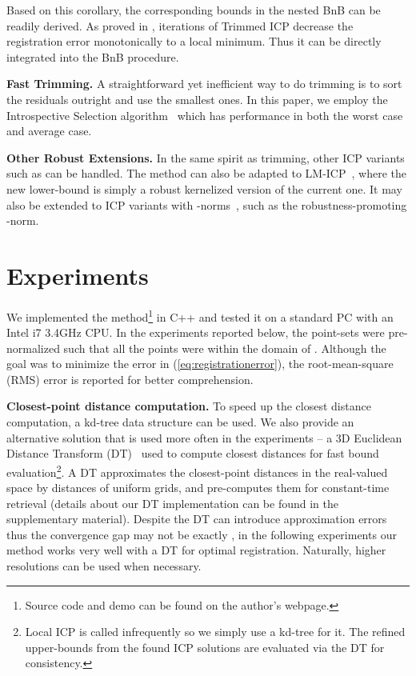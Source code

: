 \documentclass[10pt,journal,cspaper,compsoc]{IEEEtran}
\begin{document}
Based on this corollary, the corresponding bounds in the nested BnB can be readily derived. As proved in \cite{chetverikov2005robust}, iterations of Trimmed ICP decrease the registration error monotonically to a local minimum. Thus it can be directly integrated into the BnB procedure.

\vspace{0.06in}
\noindent\textbf{Fast Trimming.}
A straightforward yet inefficient way to do trimming is to sort the residuals outright and use the  smallest ones. In this paper, we employ \textcolor[rgb]{0.00,0.00,0.00}{the Introspective Selection algorithm}~\cite{musser1997introspective} which has  performance in both the worst case and average case.

\vspace{0.06in}
\noindent\textbf{Other Robust Extensions.}
In the same spirit as trimming, other ICP variants such as \cite{champleboux1992accurate,masuda1994robust} can be handled. The method can also be adapted to LM-ICP~\cite{fitzgibbon2003robust}, where the new lower-bound is simply a robust kernelized version of the current one. It may also be extended to ICP variants with -norms~\cite{bouaziz2013sparse}, such as the robustness-promoting -norm.

\section{Experiments}\label{sec:experiment}
We implemented the method\footnote{Source code and demo can be found on the author's webpage.} in C++ and tested it on a standard PC with an Intel i7 3.4GHz CPU. In the experiments reported below, the point-sets were pre-normalized such that all the points were within the domain of . Although the goal was to minimize the  error in (\ref{eq:registrationerror}), the root-mean-square (RMS) error is reported for better comprehension.

\vspace{0.06in}
\noindent\textbf{Closest-point distance computation.} To speed up the closest distance computation, a kd-tree data structure can be used. We also provide an alternative solution that is used more often in the experiments -- a 3D Euclidean Distance Transform (DT)~\cite{fitzgibbon2003robust} used to compute closest distances for fast bound evaluation\footnote{Local ICP is called infrequently so we simply use a kd-tree for it. The refined upper-bounds from the found ICP solutions are evaluated via the DT for consistency.
}.
A DT approximates the closest-point distances in the real-valued space by distances of uniform grids, and pre-computes them for constant-time retrieval (details about our DT implementation can be found in the supplementary material). Despite the DT can introduce approximation errors thus the convergence gap may not be exactly , in the following experiments our method works very well with a  DT for optimal registration. Naturally, higher resolutions can be used when necessary.
\end{document}
